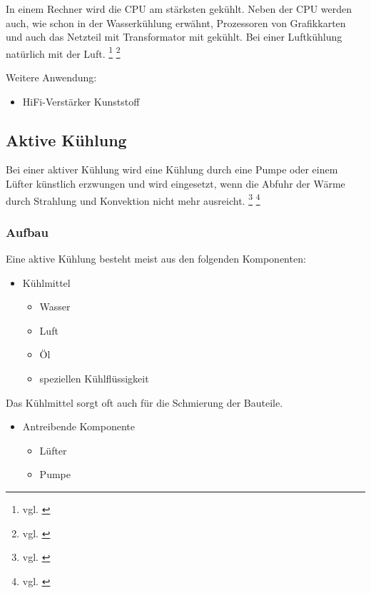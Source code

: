 In einem Rechner wird die CPU am stärksten gekühlt. Neben der CPU werden auch, wie schon in der Wasserkühlung erwähnt, Prozessoren von Grafikkarten und auch das Netzteil mit Transformator mit gekühlt. Bei einer Luftkühlung natürlich mit der Luft. \footnote{vgl. \cite{Luftkuehlung1}} \footnote{vgl. \cite{Luftkuehlung2}}



Weitere Anwendung:
\begin{itemize}
	\item HiFi-Verstärker 
	 Kunststoff
\end{itemize}

\newpage


\subsection{Aktive Kühlung} 

Bei einer aktiver Kühlung wird eine Kühlung durch eine Pumpe oder einem Lüfter künstlich erzwungen und wird eingesetzt, wenn die Abfuhr der Wärme durch Strahlung und Konvektion nicht mehr ausreicht. \footnote{vgl. \cite{Luftkuehlung1}} \footnote{vgl. \cite{Luftkuehlung2}}

\subsubsection{Aufbau}

Eine aktive Kühlung besteht meist aus den folgenden Komponenten:

\begin{itemize}
	\item Kühlmittel
		\begin{itemize}
        	\item Wasser
         	\item Luft
         	\item Öl
         	\item speziellen Kühlflüssigkeit
     	\end{itemize}
\end{itemize}

Das Kühlmittel sorgt oft auch für die Schmierung der Bauteile. 

\begin{itemize}
     \item Antreibende Komponente
     	\begin{itemize}
        	\item Lüfter
         	\item Pumpe
     	\end{itemize}	
\end{itemize}

